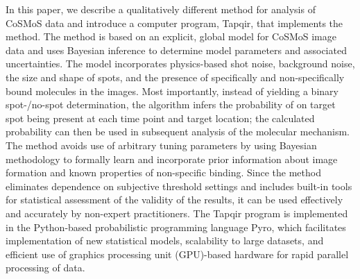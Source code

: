 In this paper, we describe a qualitatively different method for analysis of CoSMoS data and introduce a computer program, Tapqir, that implements the method. The method is based on an explicit, global model for CoSMoS image data and uses Bayesian inference to determine model parameters and associated uncertainties. The model incorporates physics-based shot noise, background noise, the size and shape of spots, and the presence of specifically and non-specifically bound molecules in the images. Most importantly, instead of yielding a binary spot-/no-spot determination, the algorithm infers the probability of on target spot being present at each time point and target location; the calculated probability can then be used in subsequent analysis of the molecular mechanism. The method avoids use of arbitrary tuning parameters by using Bayesian methodology to formally learn and incorporate prior information about image formation and known properties of non-specific binding.  Since the method eliminates dependence on subjective threshold settings and includes built-in tools for statistical assessment of the validity of the results, it can be used effectively and accurately by non-expert practitioners. The Tapqir program is implemented in the Python-based probabilistic programming language Pyro, which facilitates implementation of new statistical models, scalability to large datasets, and efficient use of graphics processing unit (GPU)-based hardware for rapid parallel processing of data. 